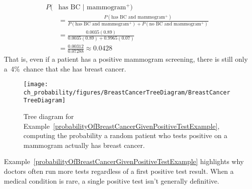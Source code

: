 \begin{example}
\begin{align*}
P(&\text{has BC $|$ mammogram$^+$}) \\
&= \frac{P(\text{has BC and mammogram$^+$})}{P(\text{has BC and mammogram$^+$}) +  P(\text{no BC and mammogram$^+$})} \\
&= \frac{0.0035(0.89)}{0.0035(0.89)+0.9965(0.07)}\\
&= \frac{0.00312}{0.07288}\approx 0.0428
\end{align*}
That is, even if a patient has a positive mammogram screening, there is still only a~4\%~chance that she has breast cancer.
\end{example}

\begin{figure}[ht]
\centering
\texttt{[image: ch\_probability/figures/BreastCancerTreeDiagram/BreastCancerTreeDiagram]}
\caption{Tree diagram for Example~\ref{probabilityOfBreastCancerGivenPositiveTestExample}, computing the probability a random patient who tests positive on a mammogram actually has breast cancer.}
\label{BreastCancerTreeDiagram}
\end{figure}

Example~\ref{probabilityOfBreastCancerGivenPositiveTestExample} highlights why doctors often run more tests regardless of a first positive test result. When a medical condition is rare, a single positive test isn't generally definitive.


